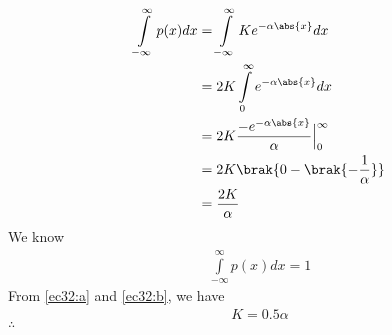 \newcommand{\Integral}[2]{\ensuremath{\int\limits_{#1}^{#2}}}
\begin{align}
    \Integral{-\infty}{\infty} p(x)dx&=\Integral{-\infty}{\infty} K e^{-\alpha \abs{x}}dx\\
                                    &=2K\Integral{0}{\infty}e^{-\alpha\abs{x}}dx\\
                                    &=2K\frac{-e^{-\alpha\abs{x}}}{\alpha}\Big|_{0}^{\infty}\\
                                    &=2K\brak{0-\brak{-\frac{1}{\alpha}}}\\
                                    &=\frac{2K}{\alpha}\label{ec32:a}
\end{align}
We know
\begin{align}
    \Integral{-\infty}{\infty} p(x)dx=1\label{ec32:b}
\end{align}
From \eqref{ec32:a} and \eqref{ec32:b}, we have
\begin{align}
    K=0.5\alpha
\end{align}
$\therefore$ 